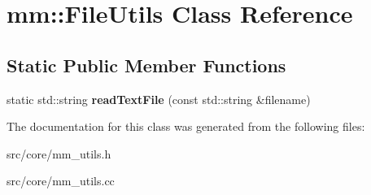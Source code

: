 \hypertarget{classmm_1_1_file_utils}{}\section{mm\+:\+:File\+Utils Class Reference}
\label{classmm_1_1_file_utils}
\subsection*{Static Public Member Functions}
\begin{DoxyCompactItemize}
\item 
\hypertarget{classmm_1_1_file_utils_a1dd11f27342fbe994abd8f83762666f5}{}static std\+::string {\bfseries read\+Text\+File} (const std\+::string \&filename)\label{classmm_1_1_file_utils_a1dd11f27342fbe994abd8f83762666f5}

\end{DoxyCompactItemize}


The documentation for this class was generated from the following files\+:\begin{DoxyCompactItemize}
\item 
src/core/mm\+\_\+utils.\+h\item 
src/core/mm\+\_\+utils.\+cc\end{DoxyCompactItemize}
